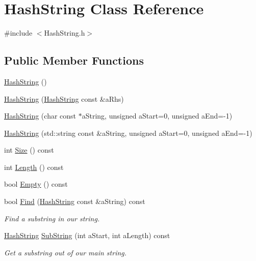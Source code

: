 \hypertarget{classHashString}{}\section{Hash\+String Class Reference}
\label{classHashString}


{\ttfamily \#include $<$Hash\+String.\+h$>$}

\subsection*{Public Member Functions}
\begin{DoxyCompactItemize}
\item 
\hyperlink{classHashString_aabc72be07fa8d0d419c947b570770528}{Hash\+String} ()
\item 
\hyperlink{classHashString_ae00cc7bf805e8dbd61bb02d9605ac196}{Hash\+String} (\hyperlink{classHashString}{Hash\+String} const \&a\+Rhs)
\item 
\hyperlink{classHashString_aa87d98fc7dcdb74810098bff764aaab1}{Hash\+String} (char const $\ast$a\+String, unsigned a\+Start=0, unsigned a\+End=-\/1)
\item 
\hyperlink{classHashString_a612abda9a98521feafbd31e11bcf33f1}{Hash\+String} (std\+::string const \&a\+String, unsigned a\+Start=0, unsigned a\+End=-\/1)
\item 
int \hyperlink{classHashString_a5cde1f185860af294cc96d7beaf4285d}{Size} () const 
\item 
int \hyperlink{classHashString_a4ca38c3c88ebb56e0d107b64868419f6}{Length} () const 
\item 
bool \hyperlink{classHashString_ad426506e1d11e1404ba0c8ecfe514b5a}{Empty} () const 
\item 
bool \hyperlink{classHashString_a22f4c279695f1e7352aed59c9f7b14f2}{Find} (\hyperlink{classHashString}{Hash\+String} const \&a\+String) const 
\begin{DoxyCompactList}\small\item\em Find a substring in our string. \end{DoxyCompactList}\item 
\hyperlink{classHashString}{Hash\+String} \hyperlink{classHashString_a26454dba8a21c966a1cefa1f85189ea1}{Sub\+String} (int a\+Start, int a\+Length) const 
\begin{DoxyCompactList}\small\item\em Get a substring out of our main string. \end{DoxyCompactList}\item 

\end{DoxyCompactItemize}
